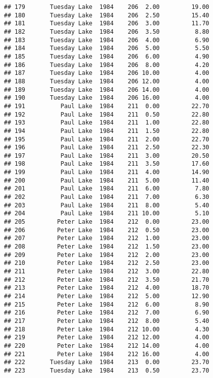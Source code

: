 \documentclass[
]{article}
\begin{document}
\begin{verbatim}
## 179       Tuesday Lake  1984    206  2.00         19.00
## 180       Tuesday Lake  1984    206  2.50         15.40
## 181       Tuesday Lake  1984    206  3.00         11.70
## 182       Tuesday Lake  1984    206  3.50          8.80
## 183       Tuesday Lake  1984    206  4.00          6.90
## 184       Tuesday Lake  1984    206  5.00          5.50
## 185       Tuesday Lake  1984    206  6.00          4.90
## 186       Tuesday Lake  1984    206  8.00          4.20
## 187       Tuesday Lake  1984    206 10.00          4.00
## 188       Tuesday Lake  1984    206 12.00          4.00
## 189       Tuesday Lake  1984    206 14.00          4.00
## 190       Tuesday Lake  1984    206 16.00          4.00
## 191          Paul Lake  1984    211  0.00         22.70
## 192          Paul Lake  1984    211  0.50         22.80
## 193          Paul Lake  1984    211  1.00         22.80
## 194          Paul Lake  1984    211  1.50         22.80
## 195          Paul Lake  1984    211  2.00         22.70
## 196          Paul Lake  1984    211  2.50         22.30
## 197          Paul Lake  1984    211  3.00         20.50
## 198          Paul Lake  1984    211  3.50         17.60
## 199          Paul Lake  1984    211  4.00         14.90
## 200          Paul Lake  1984    211  5.00         11.40
## 201          Paul Lake  1984    211  6.00          7.80
## 202          Paul Lake  1984    211  7.00          6.30
## 203          Paul Lake  1984    211  8.00          5.40
## 204          Paul Lake  1984    211 10.00          5.10
## 205         Peter Lake  1984    212  0.00         23.00
## 206         Peter Lake  1984    212  0.50         23.00
## 207         Peter Lake  1984    212  1.00         23.00
## 208         Peter Lake  1984    212  1.50         23.00
## 209         Peter Lake  1984    212  2.00         23.00
## 210         Peter Lake  1984    212  2.50         23.00
## 211         Peter Lake  1984    212  3.00         22.80
## 212         Peter Lake  1984    212  3.50         21.70
## 213         Peter Lake  1984    212  4.00         18.70
## 214         Peter Lake  1984    212  5.00         12.90
## 215         Peter Lake  1984    212  6.00          8.90
## 216         Peter Lake  1984    212  7.00          6.90
## 217         Peter Lake  1984    212  8.00          5.40
## 218         Peter Lake  1984    212 10.00          4.30
## 219         Peter Lake  1984    212 12.00          4.00
## 220         Peter Lake  1984    212 14.00          4.00
## 221         Peter Lake  1984    212 16.00          4.00
## 222       Tuesday Lake  1984    213  0.00         23.70
## 223       Tuesday Lake  1984    213  0.50         23.70

\end{verbatim}
\end{document}
